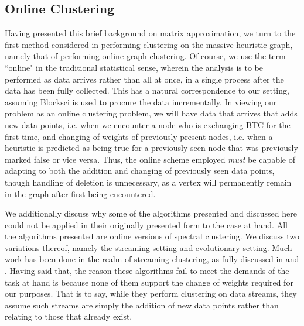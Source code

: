 \documentclass{article}
\begin{document}
\subsection{Online Clustering}
Having presented this brief background on matrix approximation, we turn to the first method considered in performing clustering on the massive heuristic graph, namely that of performing online graph clustering. Of course, we use the term ``online" in the traditional statistical sense, wherein the analysis is to be performed as data arrives rather than all at once, in a single process after the data has been fully collected. This has a natural correspondence to our setting, assuming Blocksci is used to procure the data incrementally. In viewing our problem as an online clustering problem, we will have data that arrives that adds new data points, i.e. when we encounter a node who is exchanging BTC for the first time, and changing of weights of previously present nodes, i.e. when a heuristic is predicted as being true for a previously seen node that was previously marked false or vice versa. Thus, the online scheme employed \textit{must} be capable of adapting to both the addition and changing of previously seen data points, though handling of deletion is unnecessary, as a vertex will permanently remain in the graph after first being encountered.

We additionally discuss why some of the algorithms presented and discussed here could not be applied in their originally presented form to the case at hand. All the algorithms presented are online versions of spectral clustering. We discuss two variations thereof, namely the streaming setting and evolutionary setting. Much work has been done in the realm of streaming clustering, as fully discussed in \cite{streaming} and \cite{eigen-update}. Having said that, the reason these algorithms fail to meet the demands of the task at hand is because none of them support the change of weights required for our purposes. That is to say, while they perform clustering on data streams, they assume such streams are simply the addition of new data points rather than relating to those that already exist.
\end{document}
